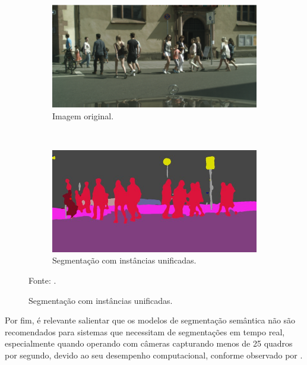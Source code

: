 \begin{figure}[H]
   \caption{Exemplo de segmentação semântica com instâncias unificadas.}
   \centering
   \label{semantic:fig:4}
    \begin{subfigure}[t]{0.8\textwidth}
        \centering
        \includegraphics[width=1\linewidth]{recursos/imagens/semantic/sema_ori.png}
        \caption{Imagem original.}
        \label{semantic:fig:4.1}
    \end{subfigure}%
    ~ 

    \begin{subfigure}[t]{0.8\textwidth}
        \centering
        \includegraphics[width=1\linewidth]{recursos/imagens/semantic/sema_unified.png}
        \caption{Segmentação com instâncias unificadas.}
        \label{semantic:fig:4.2}
    \end{subfigure}%

    Fonte: \cite{Fischer2017}.
\end{figure}

Por fim, é relevante salientar que os modelos de segmentação semântica não são recomendados para sistemas que necessitam de segmentações em tempo real, especialmente quando operando com câmeras capturando menos de 25 quadros por segundo, devido ao seu desempenho computacional, conforme observado por \cite{Minaee2021}.
